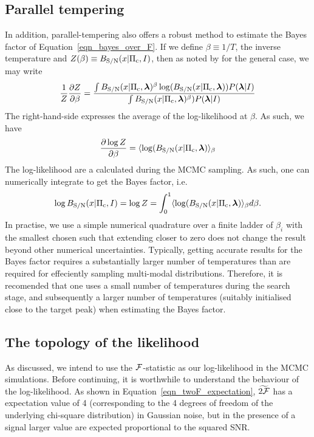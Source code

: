 \documentclass[aps, prd, twocolumn, superscriptaddress, floatfix, showpacs, nofootinbib, longbibliography]{revtex4-1}
\begin{document}
\subsection{Parallel tempering}
In addition, parallel-tempering also offers a robust method to estimate the
Bayes factor of Equation~\eqref{eqn_bayes_over_F}. If we define
$\beta\equiv1/T$, the inverse temperature and $Z(\beta)\equiv B_{\rm S/N}(x| \Pi_{\rm
c}, I)$, then as noted by \citet{goggans2004} for the general case, we may
write
\begin{align}
\frac{1}{Z} \frac{\partial Z}{\partial \beta}=
\frac{
\int B_{\rm S/N}(x| \Pi_{\rm c}, \boldsymbol{\mathbf{\lambda}})^{\beta}
\log(B_{\rm S/N}(x| \Pi_{\rm c}, \boldsymbol{\mathbf{\lambda}}))P(\boldsymbol{\mathbf{\lambda}}| I)
}
{
\int B_{\rm S/N}(x| \Pi_{\rm c}, \boldsymbol{\mathbf{\lambda}})^{\beta})P(\boldsymbol{\mathbf{\lambda}}| I)
}
\end{align}
The right-hand-side expresses the average of the log-likelihood at $\beta$. As
such, we have
\begin{align}
\frac{\partial \log Z}{\partial \beta} = 
\langle \log(B_{\rm S/N}(x| \Pi_{\rm c}, \boldsymbol{\mathbf{\lambda}}) \rangle_{\beta}
\end{align}
The log-likelihood are a calculated during the MCMC sampling. As such, one
can numerically integrate to get the Bayes factor, i.e.
\begin{align}
\log B_{\rm S/N}(x| \Pi_{\rm c}, I) = \log Z = \int_{0}^{1}
\langle \log(B_{\rm S/N}(x| \Pi_{\rm c}, \boldsymbol{\mathbf{\lambda}}) \rangle_{\beta} d\beta.
\end{align}
In practise, we use a simple numerical quadrature over a finite ladder of
$\beta_i$ with the smallest chosen such that extending closer to zero does not
change the result beyond other numerical uncertainties. Typically, getting
accurate results for the Bayes factor requires a substantially larger number of
temperatures than are required for effeciently sampling multi-modal
distributions.  Therefore, it is recomended that one uses a small number of
temperatures during the search stage, and subsequently a larger number of
temperatures (suitably initialised close to the target peak) when estimating
the Bayes factor.

\subsection{The topology of the likelihood}
As discussed, we intend to use the ${\mathcal{F}}$-statistic as our log-likelihood in the
MCMC simulations. Before continuing, it is worthwhile to understand the behaviour
of the log-likelihood. As shown in Equation~\eqref{eqn_twoF_expectation},
$\widetilde{2{\mathcal{F}}}$ has a expectation value of 4 (corresponding to the
4 degrees of freedom of the underlying chi-square distribution) in Gaussian
noise, but in the presence of a signal larger value are expected proportional
to the squared SNR. 
\end{document}
